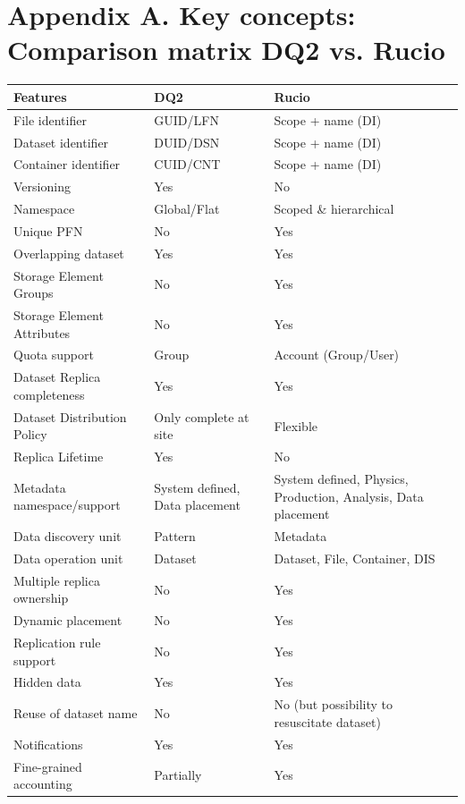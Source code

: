 \documentclass{atlasnote}
\begin{document}
\section*{Appendix A. Key concepts: Comparison matrix DQ2 vs. Rucio}
\label{Comparison_matrix::doc}\label{Comparison_matrix:key-concepts-comparison-matrix-dq2-vs-rucio}
\begin{tabular}{l l p{5cm} }
\toprule
\textbf{
Features
} & \textbf{
DQ2
} & \textbf{
Rucio
}\\
\midrule
File identifier  & GUID/LFN  & Scope + name (DI) \\
Dataset identifier  & DUID/DSN & Scope + name (DI) \\
Container identifier  & CUID/CNT & Scope + name (DI) \\
Versioning & Yes & No \\
Namespace & Global/Flat & Scoped \& hierarchical \\
Unique PFN & No & Yes \\
Overlapping dataset & Yes & Yes \\
Storage Element Groups & No  & Yes \\
Storage Element Attributes  & No  & Yes \\
Quota support & Group & Account (Group/User) \\
Dataset Replica completeness & Yes  & Yes \\
Dataset Distribution Policy & Only complete at site & Flexible \\
Replica Lifetime & Yes & No \\
Metadata namespace/support  & System defined, Data placement  & System defined, Physics, Production, Analysis, Data placement \\
Data discovery unit & Pattern & Metadata\\
Data operation unit &Dataset & Dataset, File, Container, DIS \\
Multiple replica ownership & No & Yes \\
Dynamic placement & No & Yes \\
Replication rule support & No  & Yes \\
Hidden data & Yes  & Yes \\
Reuse of dataset name & No & No (but possibility to resuscitate dataset) \\
Notifications & Yes & Yes \\
Fine-grained accounting & Partially & Yes \\
\bottomrule
\end{tabular}
\end{document}
